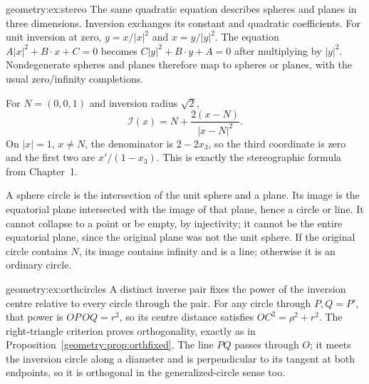 \begin{solution}{geometry:ex:stereo}
\idea The same quadratic equation describes spheres and planes in three dimensions. Inversion exchanges its constant and quadratic coefficients.
\writeup For unit inversion at zero, $y=x/|x|^2$ and $x=y/|y|^2$. The equation $A|x|^2+B\cdot x+C=0$ becomes
$C|y|^2+B\cdot y+A=0$ after multiplying by $|y|^2$. Nondegenerate spheres and planes therefore map to spheres or planes, with the usual zero/infinity completions.

For $N=(0,0,1)$ and inversion radius $\sqrt2$,
\[
\mathcal I(x)=N+\frac{2(x-N)}{|x-N|^2}.
\]
On $|x|=1$, $x\ne N$, the denominator is $2-2x_3$, so the third coordinate is zero and the first two are $x'/(1-x_3)$. This is exactly the stereographic formula from Chapter~1.

A sphere circle is the intersection of the unit sphere and a plane. Its image is the equatorial plane intersected with the image of that plane, hence a circle or line. It cannot collapse to a point or be empty, by injectivity; it cannot be the entire equatorial plane, since the original plane was not the unit sphere. If the original circle contains $N$, its image contains infinity and is a line; otherwise it is an ordinary circle.
\end{solution}

\begin{solution}{geometry:ex:orthcircles}
\idea A distinct inverse pair fixes the power of the inversion centre relative to every circle through the pair.
\writeup For any circle through $P,Q=P'$, that power is $OP\,OQ=r^2$, so its centre distance satisfies $OC^2=\rho^2+r^2$. The right-triangle criterion proves orthogonality, exactly as in Proposition~\ref{geometry:prop:orthfixed}. The line $PQ$ passes through $O$; it meets the inversion circle along a diameter and is perpendicular to its tangent at both endpoints, so it is orthogonal in the generalized-circle sense too.
\end{solution}

